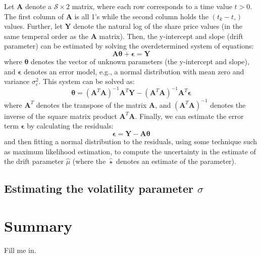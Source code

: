 \documentclass[11pt]{article}
\theoremstyle{definition}
\begin{document}
Let $\mathbf{A}$ denote a $\mathcal{S}\times{2}$ matrix, where each row corresponds to a time value $t>0$. 
The first column of $\mathbf{A}$ is all 1's while the second column holds the $(t_{k}-t_{\circ})$ values. 
Further, let $\mathbf{Y}$ denote the natural log of the share price values (in the same temperal order as the $\mathbf{A}$ matrix). 
Then, the y-intercept and slope (drift parameter) can be estimated by solving the overdetermined system of equations:
\begin{equation*}
\mathbf{A}\mathbf{\theta} + \mathbf{\epsilon} = \mathbf{Y}
\end{equation*}
where $\mathbf{\theta}$ denotes the vector of unknown parameters (the y-intercept and slope), and $\mathbf{\epsilon}$ denotes an error model, e.g., a normal distribution with mean zero and variance $\sigma_{\epsilon}^{2}$.
This system can be solved as:
\begin{equation*}
\mathbf{\theta} = (\mathbf{A}^{T}\mathbf{A})^{-1}\mathbf{A}^{T}\mathbf{Y} - (\mathbf{A}^{T}\mathbf{A})^{-1}\mathbf{A}^{T}\mathbf{\epsilon}
\end{equation*}
where $\mathbf{A}^{T}$ denotes the transpose of the matrix $\mathbf{A}$, and $(\mathbf{A}^{T}\mathbf{A})^{-1}$ denotes the inverse of the square matrix product $\mathbf{A}^{T}\mathbf{A}$. 
Finally, we can estimate the error term $\mathbf{\epsilon}$ by calculating the residuals:
\begin{equation*}
\mathbf{\epsilon} = \mathbf{Y} - \mathbf{A}\mathbf{\theta}
\end{equation*}
and then fitting a normal distribution to the residuals, using some technique such as maximum likelihood estimation, to compute the uncertainty in the estimate of the drift parameter $\hat{\mu}$ 
(where the $\hat{\star}$ denotes an estimate of the parameter).

\subsection*{Estimating the volatility parameter $\sigma$}


\section*{Summary}
Fill me in.



\clearpage
\printindex
\end{document}
